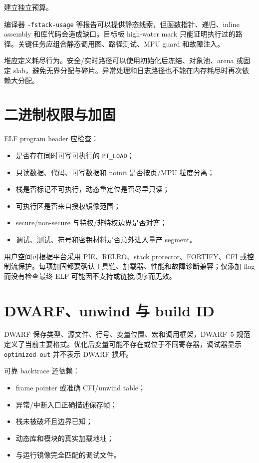 建立独立预算。

编译器 \texttt{-fstack-usage} 等报告可以提供静态线索，但函数指针、递归、inline assembly 和库代码会造成缺口。目标板 high-water mark 只能证明执行过的路径。关键任务应组合静态调用图、路径测试、MPU guard 和故障注入。

堆应定义耗尽行为。安全/实时路径可以使用初始化后冻结、对象池、arena 或固定 slab，避免无界分配与碎片。异常处理和日志路径也不能在内存耗尽时再次依赖大分配。

\section{二进制权限与加固}

ELF program header 应检查：

\begin{itemize}
  \item 是否存在同时可写可执行的 \texttt{PT\_LOAD}；
  \item 只读数据、代码、可写数据和 noinit 是否按页/MPU 粒度分离；
  \item 栈是否标记不可执行，动态重定位是否尽早只读；
  \item 可执行区是否来自授权镜像范围；
  \item secure/non-secure 与特权/非特权边界是否对齐；
  \item 调试、测试、符号和密钥材料是否意外进入量产 segment。
\end{itemize}

用户空间可根据平台采用 PIE、RELRO、stack protector、FORTIFY、CFI 或控制流保护。每项加固都要确认工具链、加载器、性能和故障诊断兼容；仅添加 flag 而没有检查最终 ELF 可能因不支持或链接顺序而无效。

\section{DWARF、unwind 与 build ID}

DWARF 保存类型、源文件、行号、变量位置、宏和调用框架，DWARF~5 规范定义了当前主要格式\cite{dwarf5}。优化后变量可能不存在或位于不同寄存器，调试器显示 \texttt{optimized out} 并不表示 DWARF 损坏。

可靠 backtrace 还依赖：

\begin{itemize}
  \item frame pointer 或准确 CFI/unwind table；
  \item 异常/中断入口正确描述保存帧；
  \item 栈未被破坏且边界已知；
  \item 动态库和模块的真实加载地址；
  \item 与运行镜像完全匹配的调试文件。
\end{itemize}

